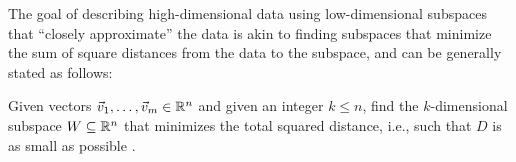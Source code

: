 \documentclass{ximera}
\begin{document}
The goal of describing high-dimensional data using low-dimensional subspaces that ``closely approximate'' the data is akin to finding subspaces that minimize the sum of square distances from the data to the subspace, and can be generally stated as follows:


 
\begin{problem}\label{prop:subspace-fitting}

  Given vectors $\vec{v}_1,\ldots,\vec{v}_m\in\mathbb{R}^n$ and given an
  integer $k\leq n$, find the $k$-dimensional subspace
  $W\subseteq\mathbb{R}^n$ that minimizes the total squared distance, i.e.,
  such that $D$ is as small as possible%
  .
\end{problem}
\end{document}
